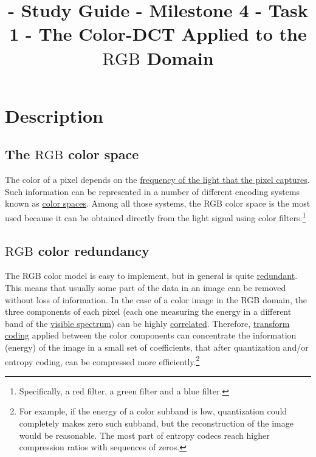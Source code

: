 

\title{\SM{} - Study Guide - Milestone 4 - Task 1 - The Color-DCT Applied to the $\text{RGB}$ Domain}

\maketitle

\tableofcontents

\section{Description}

\subsection{The $\text{RGB}$ color space}

The color of a pixel depends on the
\href{https://en.wikipedia.org/wiki/Visible_spectrum}{frequency of the
  light that the pixel captures}. Such information can be represented
in a number of different encoding systems known as
\href{https://en.wikipedia.org/wiki/Color_space}{color spaces}. Among
all those systems, the RGB color space is the most used because it can
be obtained directly from the light signal using color
filters.\footnote{Specifically, a red filter, a green filter and a
blue filter.}


\subsection{$\text{RGB}$ color redundancy}

The RGB color model is easy to implement, but in general is
quite
\href{https://en.wikipedia.org/wiki/Data_redundancy}{redundant}. This
means that usually some part of the data in an image can be removed
without loss of information. In the case of a color image in the RGB
domain, the three components of each pixel (each one measuring the
energy in a different band of the
\href{https://en.wikipedia.org/wiki/Visible_spectrum}{visible
  spectrum}) can be highly
\href{https://en.wikipedia.org/wiki/Correlation_and_dependence}{correlated}. Therefore,
\href{https://vicente-gonzalez-ruiz.github.io/transform_coding/}{transform
  coding} applied between the color components can concentrate the
information (energy) of the image in a small set of coefficients, that
after quantization and/or entropy coding, can be compressed more
efficiently.\footnote{For example, if the energy of a color subband is
low, quantization could completely makes zero such subband, but the
reconstruction of the image would be reasonable. The most part of
entropy codecs reach higher compression ratios with sequences of
zeros.}

